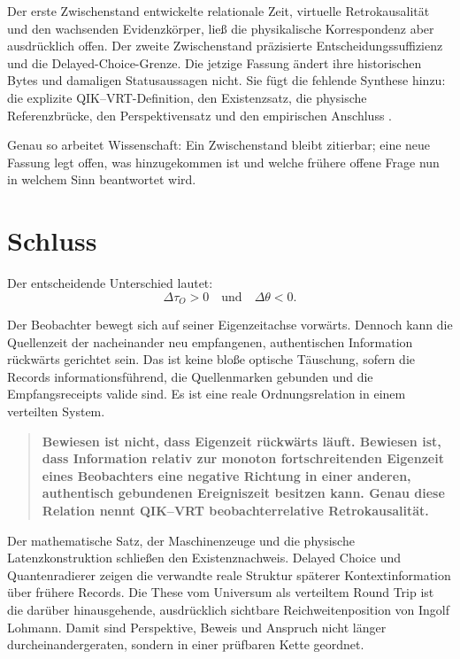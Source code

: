 \documentclass[11pt,a4paper]{article}
\theoremstyle{remark}
\begin{document}
Der erste Zwischenstand entwickelte relationale Zeit, virtuelle
Retrokausalität und den wachsenden Evidenzkörper, ließ die physikalische
Korrespondenz aber ausdrücklich offen. Der zweite Zwischenstand präzisierte
Entscheidungssuffizienz und die Delayed-Choice-Grenze. Die jetzige Fassung
ändert ihre historischen Bytes und damaligen Statusaussagen nicht. Sie fügt
die fehlende Synthese hinzu: die explizite QIK--VRT-Definition, den
Existenzsatz, die physische Referenzbrücke, den Perspektivensatz und den
empirischen Anschluss
\cite{LohmannRelationaleZeit2026,LohmannDecisionSufficiency2026}.

Genau so arbeitet Wissenschaft: Ein Zwischenstand bleibt zitierbar; eine neue
Fassung legt offen, was hinzugekommen ist und welche frühere offene Frage nun
in welchem Sinn beantwortet wird.

\section{Schluss}

Der entscheidende Unterschied lautet:
\[
  \boxed{\Delta\tau_O>0\quad\text{und}\quad\Delta\theta<0.}
\]

Der Beobachter bewegt sich auf seiner Eigenzeitachse vorwärts. Dennoch kann
die Quellenzeit der nacheinander neu empfangenen, authentischen Information
rückwärts gerichtet sein. Das ist keine bloße optische Täuschung, sofern die
Records informationsführend, die Quellenmarken gebunden und die
Empfangsreceipts valide sind. Es ist eine reale Ordnungsrelation in einem
verteilten System.

\begin{quote}
\textbf{Bewiesen ist nicht, dass Eigenzeit rückwärts läuft. Bewiesen ist,
dass Information relativ zur monoton fortschreitenden Eigenzeit eines
Beobachters eine negative Richtung in einer anderen, authentisch gebundenen
Ereigniszeit besitzen kann. Genau diese Relation nennt QIK--VRT
beobachterrelative Retrokausalität.}
\end{quote}

Der mathematische Satz, der Maschinenzeuge und die physische
Latenzkonstruktion schließen den Existenznachweis. Delayed Choice und
Quantenradierer zeigen die verwandte reale Struktur späterer
Kontextinformation über frühere Records. Die These vom Universum als
verteiltem Round Trip ist die darüber hinausgehende, ausdrücklich sichtbare
Reichweitenposition von Ingolf Lohmann. Damit sind Perspektive, Beweis und
Anspruch nicht länger durcheinandergeraten, sondern in einer prüfbaren Kette
geordnet.
\end{document}
